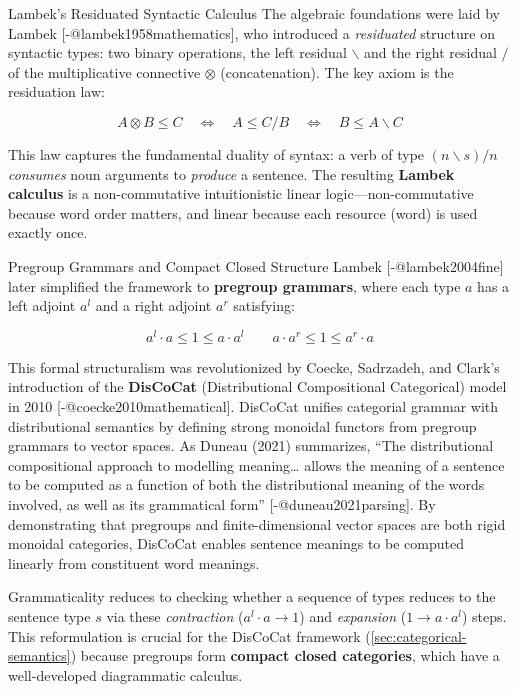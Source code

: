\documentclass[
  ignorenonframetext,
]{beamer}
\begin{document}
\begin{frame}{Lambek's Residuated Syntactic Calculus}
\protect{}\label{lambeks-residuated-syntactic-calculus}
The algebraic foundations were laid by Lambek
{[}-@lambek1958mathematics{]}, who introduced a \emph{residuated}
structure on syntactic types: two binary operations, the left residual
\(\backslash\) and the right residual \(/\) of the multiplicative
connective \(\otimes\) (concatenation). The key axiom is the residuation
law:

\[A \otimes B \leq C \quad \iff \quad A \leq C / B \quad \iff \quad B \leq A \backslash C \tag{3.1}\]

This law captures the fundamental duality of syntax: a verb of type
\((n \backslash s) / n\) \emph{consumes} noun arguments to
\emph{produce} a sentence. The resulting \textbf{Lambek calculus} is a
non-commutative intuitionistic linear logic---non-commutative because
word order matters, and linear because each resource (word) is used
exactly once.

\begin{block}{Pregroup Grammars and Compact Closed Structure}
\protect{}\label{pregroup-grammars-and-compact-closed-structure}
Lambek {[}-@lambek2004fine{]} later simplified the framework to
\textbf{pregroup grammars}, where each type \(a\) has a left adjoint
\(a^l\) and a right adjoint \(a^r\) satisfying:

\[a^l \cdot a \leq 1 \leq a \cdot a^l \qquad a \cdot a^r \leq 1 \leq a^r \cdot a \tag{3.2}\]

This formal structuralism was revolutionized by Coecke, Sadrzadeh, and
Clark's introduction of the \textbf{DisCoCat} (Distributional
Compositional Categorical) model in 2010 {[}-@coecke2010mathematical{]}.
DisCoCat unifies categorial grammar with distributional semantics by
defining strong monoidal functors from pregroup grammars to vector
spaces. As Duneau (2021) summarizes, ``The distributional compositional
approach to modelling meaning\ldots{} allows the meaning of a sentence
to be computed as a function of both the distributional meaning of the
words involved, as well as its grammatical form''
{[}-@duneau2021parsing{]}. By demonstrating that pregroups and
finite-dimensional vector spaces are both rigid monoidal categories,
DisCoCat enables sentence meanings to be computed linearly from
constituent word meanings.

Grammaticality reduces to checking whether a sequence of types reduces
to the sentence type \(s\) via these \emph{contraction}
(\(a^l \cdot a \to 1\)) and \emph{expansion} (\(1 \to a \cdot a^l\))
steps. This reformulation is crucial for the DisCoCat framework
(\autoref{sec:categorical-semantics}) because pregroups form
\textbf{compact closed categories}, which have a well-developed
diagrammatic calculus.
\end{block}
\end{frame}
\end{document}
